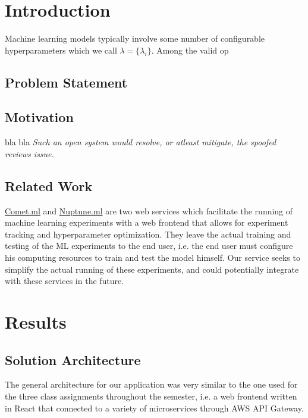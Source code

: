 \documentclass[12pt,oneside]{amsart}
\makeatletter
\newcommand*\ie{i.e.\@\xspace}
\makeatother
\begin{document}
\maketitle
\setlength{\columnsep}{20pt}
\begin{multicols}{2}

\section{Introduction}\label{sec:introduction}
Machine learning models typically involve some number of configurable hyperparameters which we call $\lambda = \{ \lambda_i \}$.
Among the valid op

\subsection{Problem Statement} \label{ch:problem_statement}
\subsection{Motivation} \label{ch:motivation}
bla bla \textit{Such an open system would resolve, or atleast mitigate, the spoofed reviews issue.}

\subsection{Related Work} \label{ch:previous}
\href{https://comet.ml/}{Comet.ml} and \href{https://neptune.ml/}{Nuptune.ml} are two web services which facilitate the running of machine learning experiments with a web frontend that allows for experiment tracking and hyperparameter optimization.
They leave the actual training and testing of the ML experiments to the end user, \ie the end user must configure his computing resources to train and test the model himself.
Our service seeks to simplify the actual running of these experiments, and could potentially integrate with these services in the future.

\section{Results} \label{ch:results}
\subsection{Solution Architecture}
The general architecture for our application was very similar to the one used for the three class assignments throughout the semester,
\ie a web frontend written in React that connected to a variety of microservices through AWS API Gateway.


\end{multicols}
\end{document}
